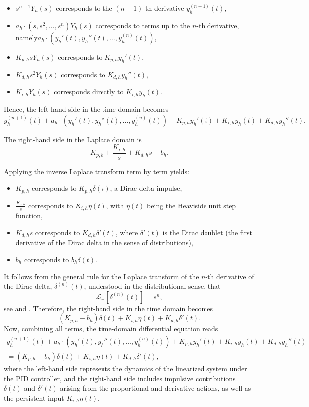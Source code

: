 \documentclass[preprint,12pt]{elsarticle}
\begin{document}
\begin{itemize}
	\item \(s^{n+1} Y_h(s)\) corresponds to the \((n+1)\)-th derivative \(y_h^{(n+1)}(t)\),
	\item \(a_h \cdot (s, s^2, \dots, s^n) Y_h(s)\) corresponds to terms up to the \(n\)-th derivative, namely\newline \(a_h \cdot (y_h'(t), y_h''(t), \dots, y_h^{(n)}(t))\),
	\item \(K_{p,h} s Y_h(s)\) corresponds to \(K_{p,h} y_h'(t)\),
	\item \(K_{d,h} s^2 Y_h(s)\) corresponds to \(K_{d,h} y_h''(t)\),
	\item \(K_{i,h} Y_h(s)\) corresponds directly to \(K_{i,h} y_h(t)\).
\end{itemize}

Hence, the left-hand side in the time domain becomes
\[
y_h^{(n+1)}(t) + a_h \cdot (y_h'(t), y_h''(t), \dots, y_h^{(n)}(t)) + K_{p,h} y_h'(t) + K_{i,h} y_h(t) + K_{d,h} y_h''(t).
\]

The right-hand side in the Laplace domain is
\[
K_{p,h} + \frac{K_{i,h}}{s} + K_{d,h}s - b_h.
\]

Applying the inverse Laplace transform term by term yields:

\begin{itemize}
	\item \(K_{p,h}\) corresponds to \(K_{p,h} \delta(t)\), a Dirac delta impulse,
	\item \(\frac{K_{i,h}}{s}\) corresponds to \(K_{i,h} \eta(t)\), with \(\eta(t)\) being the Heaviside unit step function,
	\item \(K_{d,h}s\) corresponds to \(K_{d,h} \delta'(t)\), where \(\delta'(t)\) is the Dirac doublet (the first derivative of the Dirac delta in the sense of distributions),
	\item \(b_h\) corresponds to \(b_h \delta(t)\).
\end{itemize}

It follows from the general rule for the Laplace transform of the \(n\)-th derivative of the Dirac delta, \(\delta^{(n)}(t)\), understood in the distributional sense, that
\[
\mathcal{L}_-[\delta^{(n)}(t)] = s^n,
\]
see \cite{papoulis1962} and \cite{Lundberg2007}.  
Therefore, the right-hand side in the time domain becomes
\[
(K_{p,h} - b_h)\delta(t) + K_{i,h} \eta(t) + K_{d,h} \delta'(t).
\]
Now, combining all terms, the time-domain differential equation reads
\begin{equation}\label{model:general}
\begin{aligned}
y_h^{(n+1)}(t) + a_h \cdot (y_h'(t), y_h''(t), \dots, y_h^{(n)}(t))
+ K_{p,h} y_h'(t) + K_{i,h} y_h(t) + K_{d,h} y_h''(t) \\
= \left(K_{p,h}- b_h  \right)\delta(t) + K_{i,h} \eta(t) + K_{d,h} \delta'(t),
\end{aligned}
\end{equation}
where the left-hand side represents the dynamics of the linearized system under the PID controller, and the right-hand side includes impulsive contributions \( \delta(t) \) and \( \delta'(t) \) arising from the proportional and derivative actions, as well as the persistent input \(K_{i,h} \eta(t)\).
\end{document}
